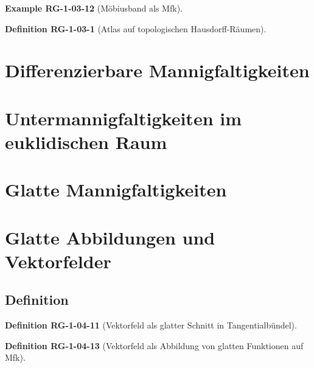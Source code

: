 \documentclass[10pt, letterpaper]{article}
\newcommand{\CustomHeading}[3]{%
  \par\medskip\noindent%
  \textbf{#1 #2} \textnormal{(#3)}.\enskip%
}
\newenvironment{DEF}[2]{\CustomHeading{Definition}{#1}{#2}}{}
\newenvironment{EXA}[2]{\CustomHeading{Example}{#1}{#2}}{}
\begin{document}
\begin{EXA}{RG-1-03-12}{Möbiusband als Mfk}

\end{EXA}









\begin{DEF}{RG-1-03-1}{Atlas auf topologischen Hausdorff-Räumen}

\end{DEF}




\section{Differenzierbare Mannigfaltigkeiten}





\section{Untermannigfaltigkeiten im euklidischen Raum}





\section{Glatte Mannigfaltigkeiten}





\section{Glatte Abbildungen und Vektorfelder}

\subsection{Definition}

\begin{DEF}{RG-1-04-11}{Vektorfeld als glatter Schnitt in Tangentialbündel}

\end{DEF}

\begin{DEF}{RG-1-04-13}{Vektorfeld als Abbildung von glatten Funktionen auf Mfk}

\end{DEF}
\end{document}
